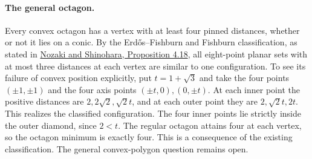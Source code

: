 \documentclass[11pt]{article}
\begin{document}
\paragraph{The general octagon.}
Every convex octagon has a vertex with at least four pinned distances, whether or not it lies on a conic. By the Erd\H{o}s--Fishburn and Fishburn classification, as stated in \href{https://arxiv.org/abs/0906.0199}{Nozaki and Shinohara, Proposition 4.18}, all eight-point planar sets with at most three distances at each vertex are similar to one configuration. To see its failure of convex position explicitly, put $t=1+\sqrt3$ and take the four points $(\pm1,\pm1)$ and the four axis points $(\pm t,0),(0,\pm t)$. At each inner point the positive distances are $2,2\sqrt2,\sqrt2 t$, and at each outer point they are $2,\sqrt2 t,2t$. This realizes the classified configuration. The four inner points lie strictly inside the outer diamond, since $2<t$. The regular octagon attains four at each vertex, so the octagon minimum is exactly four. This is a consequence of the existing classification. The general convex-polygon question remains open.

\clearpage
\appendix
\end{document}

